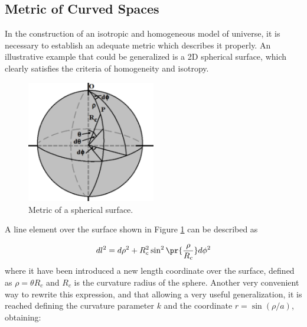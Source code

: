 	\subsection{Metric of Curved Spaces}
	\label{subsec:MetricOFCurvedSpaces}

	
In the construction of an isotropic and homogeneous model of universe, it 
is necessary to establish an adequate metric which describes it properly. 
An illustrative example that could be generalized is a 2D spherical 
surface, which clearly satisfies the criteria of homogeneity and isotropy.



\begin{figure}[htbp]
	\centering
	\includegraphics[width=0.5\textwidth]
	{./figures/2_theoretical_framework/2D_Sphere.png}
	
	\caption{\small{Metric of a spherical surface.}}
	
	\label{fig:2sphere}
\end{figure}


A line element over the surface shown in Figure \ref{fig:2sphere} can
be described as


\[ dl^2 = d\rho^2 + R_c^2 \sin^2 \pr{ \frac{\rho}{R_c}}d\phi^2 \]
where it have been introduced a new length coordinate over the surface, 
defined as $\rho = \theta R_c$ and $R_c$ is the curvature radius of the 
sphere. Another very convenient way to rewrite this expression, and that 
allowing a very useful generalization, it is reached defining the curvature
parameter $k$ and the coordinate $r = \sin (\rho/a)$, obtaining:


